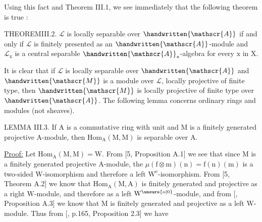Using this fact and Theorem III.1, we see immediately that the following theorem is true :

THEOREMIII.2. $\mathscr{L}$ is locally separable over $\handwritten{\mathscr{A}}$ if and only if $\mathscr{L}$ is finitely presented as an $\handwritten{\mathscr{A}}$-module and $\mathscr{L}_{\mathrm x}$ is a central separable $\handwritten{\mathscr{A}}_{\mathrm x}$-algebra for every $\mathrm x$ in $\mathrm X$.

It is clear that if $\mathscr{L}$ is locally separable over $\handwritten{\mathscr{A}}$ and $\handwritten{\mathscr{M}}$ is a module over $\mathscr{L}$, locally projective of finite type, then $\handwritten{\mathscr{M}}$ is locally projective of finite type over $\handwritten{\mathscr{A}}$. The following lemma concerns ordinary rings and modules (not sheaves).

LEMMA III.3. If $\mathrm A$ is a commutative ring with unit and $\mathrm M$ is a finitely generated projective $\mathrm A$-module, then $\mathrm{Hom}_{\mathrm A}(\mathrm M,\mathrm M)$ is separable over $\mathrm A$.

\uline{Proof:} Let $\mathrm{Hom}_{\mathrm A}(\mathrm M,\mathrm M)=\mathrm W$. From [5, Proposition A.1] we see that since $\mathrm M$ is a finitely generated projective $\mathrm A$-module, the  $\mu(\mathrm f\otimes\mathrm m)(\mathrm n)=\mathrm f(\mathrm n)(\mathrm m)$ is a two-sided $\mathrm W$-isomorphism and therefore a left $\mathrm W^{\mathrm e}$-isomorphism. From [5, Theorem A.2] we know that $\mathrm{Hom}_{\mathrm A}(\mathrm M,\mathrm A)$ is finitely generated and projective as a right $\mathrm W$-module, and therefore as a left $\mathrm W^{\unsure{\mathrm{o}|0}}$-module, and from [, Proposition A.3] we know that $\mathrm M$ is finitely generated and projective as a left $\mathrm W$-module. Thus from [, p.165, Proposition 2.3] we have
